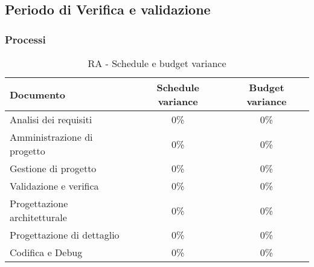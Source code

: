 \documentclass[../PianoDiQualifica.tex]{subfiles}
\begin{document}
						\subsection{Periodo di Verifica e validazione}
						\subsubsection{Processi}
						\begin{table}[H]
							\center
							\begin{tabular}{|l|c|c|}
								\hline
								\rowcolor{blue!30}\textbf{Documento} & \textbf{Schedule variance} & \textbf{Budget variance} \\ \hline
								Analisi dei requisiti & 0\% & 0\% \\ \hline
								Amministrazione di progetto & 0\% & 0\% \\ \hline
								Gestione di progetto & 0\% & 0\% \\ \hline
								Validazione e verifica & 0\% & 0\% \\ \hline
								Progettazione architetturale & 0\% & 0\% \\ \hline
								Progettazione di dettaglio & 0\% & 0\% \\ \hline
								Codifica e Debug & 0\% & 0\% \\ \hline
							\end{tabular}
							\caption{RA - Schedule e budget variance}
						\end{table}
\end{document}
